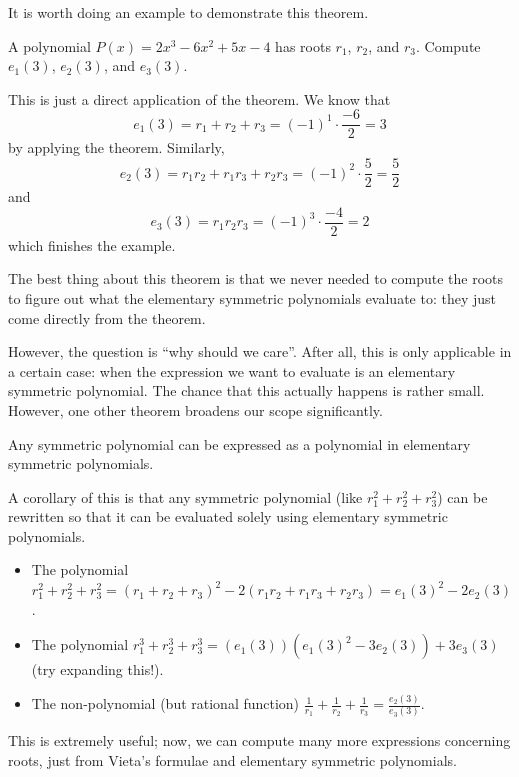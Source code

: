 \documentclass[11pt]{scrartcl}
\begin{document}
It is worth doing an example to demonstrate this theorem.

\begin{example*}
A polynomial $P(x) = 2x^3-6x^2+5x-4$ has roots $r_1$, $r_2$, and $r_3$. Compute $e_1(3)$, $e_2(3)$, and $e_3(3)$.
\end{example*}

This is just a direct application of the theorem. We know that \[e_1(3) = r_1+r_2+r_3 = (-1)^1\cdot \dfrac{-6}{2} = 3\] by applying the theorem. Similarly, \[e_2(3) = r_1r_2+r_1r_3+r_2r_3 = (-1)^2\cdot \dfrac{5}{2} = \dfrac{5}{2}\] and \[e_3(3) = r_1r_2r_3 = (-1)^3\cdot \dfrac{-4}{2} = 2\] which finishes the example.

The best thing about this theorem is that we never needed to compute the roots to figure out what the elementary symmetric polynomials evaluate to: they just come directly from the theorem.

However, the question is ``why should we care''. After all, this is only applicable in a certain case: when the expression we want to evaluate is an elementary symmetric polynomial. The chance that this actually happens is rather small. However, one other theorem broadens our scope significantly.

\begin{theorem*}
Any symmetric polynomial can be expressed as a polynomial in elementary symmetric polynomials.
\end{theorem*}

A corollary of this is that any symmetric polynomial (like $r_1^2+r_2^2+r_3^2$) can be rewritten so that it can be evaluated solely using elementary symmetric polynomials.

\begin{example*}
\begin{itemize}
\item The polynomial $r_1^2+r_2^2+r_3^2 = (r_1+r_2+r_3)^2-2(r_1r_2+r_1r_3+r_2r_3) = e_1(3)^2-2e_2(3)$.
\item The polynomial $r_1^3+r_2^3+r_3^3 = (e_1(3))(e_1(3)^2-3e_2(3))+3e_3(3)$ (try expanding this!).
\item The non-polynomial (but rational function) $\tfrac{1}{r_1}+\tfrac{1}{r_2}+\tfrac{1}{r_3} = \tfrac{e_2(3)}{e_3(3)}$.
\end{itemize}
\end{example*}

This is extremely useful; now, we can compute many more expressions concerning roots, just from Vieta's formulae and elementary symmetric polynomials.
\end{document}

